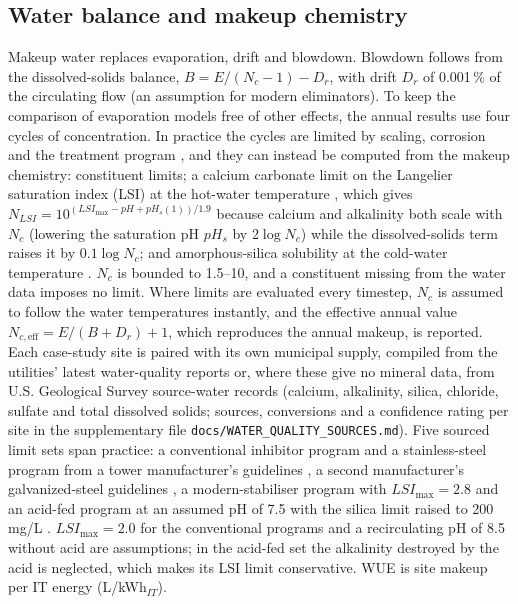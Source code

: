 \documentclass[preprint,12pt]{elsarticle}
\begin{document}
\subsection{Water balance and makeup chemistry}\label{sec:chem}
Makeup water replaces evaporation, drift and blowdown. Blowdown follows from the dissolved-solids balance,
$B = E/(N_c-1) - D_r$, with drift $D_r$ of 0.001\,\% of the circulating flow (an assumption for modern eliminators). To
keep the comparison of evaporation models free of other effects, the annual results use four cycles of concentration.
In practice the cycles are limited by scaling, corrosion and the treatment program
\citep{ashrae2023water,altman2012membrane,soliman2022treatment}, and they can instead be computed from the makeup
chemistry: constituent limits; a calcium carbonate limit on the Langelier saturation index (LSI) at the hot-water
temperature \citep{langelier1936analytical}, which gives $N_{LSI}=10^{(LSI_{\max}-pH+pH_s(1))/1.9}$ because calcium and
alkalinity both scale with $N_c$ (lowering the saturation pH $pH_s$ by $2\log N_c$) while the dissolved-solids term raises
it by $0.1\log N_c$; and amorphous-silica solubility at the cold-water temperature \citep{fournier1977chemical}. $N_c$ is
bounded to 1.5--10, and a constituent missing from the water data imposes no limit. Where limits are evaluated every
timestep, $N_c$ is assumed to follow the water temperatures instantly, and the effective annual value
$N_{c,\mathrm{eff}}=E/(B+D_r)+1$, which reproduces the annual makeup, is reported. Each case-study site is paired with its
own municipal supply, compiled from the utilities' latest water-quality reports or, where these give no mineral data,
from U.S. Geological Survey source-water records (calcium, alkalinity, silica, chloride, sulfate and total dissolved
solids; sources, conversions and a confidence rating per site in the supplementary file
\texttt{docs/WATER\_QUALITY\_SOURCES.md}). Five sourced limit sets span practice: a conventional inhibitor program and a
stainless-steel program from a tower manufacturer's guidelines \citep{evapco2019om}, a second manufacturer's
galvanized-steel guidelines \citep{bac2020baltibond}, a modern-stabiliser program with $LSI_{\max}=2.8$
\citep{icc2014gew174} and an acid-fed program at an assumed pH of 7.5 with the silica limit raised to 200\,mg/L
\citep{demadis2003gordian}. $LSI_{\max}=2.0$ for the conventional programs and a recirculating pH of 8.5 without acid are
assumptions; in the acid-fed set the alkalinity destroyed by the acid is neglected, which makes its LSI limit
conservative. WUE is site makeup per IT energy (L/kWh$_{IT}$).
\end{document}
